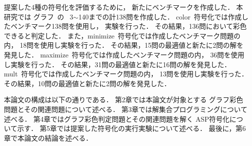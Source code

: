 提案した4種の符号化を評価するために，
新たにベンチマークを作成した．
本研究では
グラフ~\cite{Knuth:TAOCP:SAT}の
~3$\sim$140までの計138問を作成した．
\textsf{color}~符号化では作成したベンチマーク138問を使用し，
実験を行った．
その結果，136問において彩色できると判定した．
また，\textsf{minimize}~符号化では作成したベンチマーク問題の内，
18問を使用し実験を行った．
その結果，15問の最適値と新たに2問の解を発見した．
\textsf{maximize}~符号化では作成したベンチマーク問題の内，
36問を使用し実験を行った．
その結果，31問の最適値と新たに16問の解を発見した．
\textsf{mult}~符号化では作成したベンチマーク問題の内，
13問を使用し実験を行った．
その結果，10問の最適値と新たに2問の解を発見した．


本論文の構成は以下の通りである．
第2章では本論文が対象とする
グラフ彩色問題とその関連問題について述べる．
第3章では解集合プログラミングについて述べる．
第4章ではグラフ彩色判定問題とその関連問題を解く
ASP符号化について示す．
第5章では提案した符号化の実行実験について述べる．
最後に，第6章で本論文の結論を述べる．


